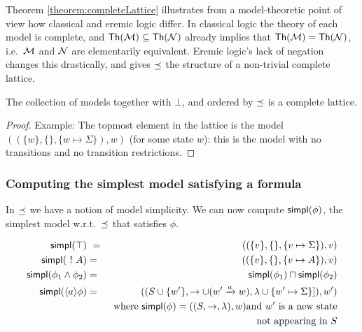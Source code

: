 \NI Theorem \ref{theorem:completeLattice} illustrates from a
model-theoretic point of view how classical and eremic logic
differ. In classical logic the theory of each model is complete, and
$\mathsf{Th}(\mathcal{M}) \subseteq \mathsf{Th}(\mathcal{N})$ already implies that
$\mathsf{Th}(\mathcal{M}) = \mathsf{Th}(\mathcal{N})$, i.e.~$\mathcal{M}$ and $\mathcal{N}$
are elementarily equivalent. Eremic logic's lack of negation changes
this drastically, and gives $\preceq$ the structure of a non-trivial
complete lattice.

\begin{theorem}
The collection of models together with $\bot$, and ordered by $\preceq $
is a complete lattice.  
\end{theorem}
\begin{proof}
  Example: The topmost element in the lattice is
the model $( (\{w\}, \{\}, \{w \mapsto \Sigma\}), w)$ (for some state
$w$): this is the model with no transitions and no transition
restrictions.
\end{proof}

\subsubsection{Computing the simplest model satisfying a formula}

\NI In $\preceq $ we have a notion of model simplicity.  We can now
compute $\mathsf{simpl}(\phi)$, the simplest model w.r.t.~$\preceq $ that
satisfies $\phi$.

\begin{eqnarray*}
  \mathsf{simpl}(\top) &\ = \ & ( (\{v\}, \{\}, \{v \mapsto \Sigma\}), v)  \\
  \mathsf{simpl}(\ ! \  A) & = & ( (\{v\}, \{\}, \{v \mapsto A\}), v)  \\
  \mathsf{simpl}(\phi_1 \land \phi_2) & = & \mathsf{simpl}(\phi_1) \sqcap \mathsf{simpl}(\phi_2)  \\
  \mathsf{simpl}(\langle a \rangle \phi) 
     & = & ( (S \cup \{w'\}, \rightarrow \cup (w' \xrightarrow{a} w), \lambda \cup \{w' \mapsto \Sigma\}]), w')  \\
		& & \mbox{where }\mathsf{simpl}(\phi) = ( (S, \rightarrow, \lambda), w) \mbox{and } w' \mbox{ is a new state} \\
                &&  \mbox{not appearing in }S 
\end{eqnarray*}

